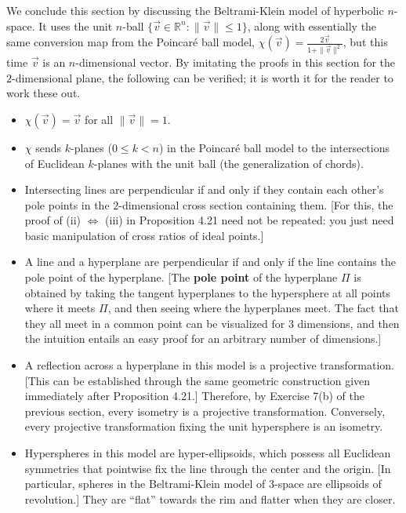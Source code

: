 \documentclass[leqno]{book}
\begin{document}
\noindent We conclude this section by discussing the Beltrami-Klein model of hyperbolic $n$-space.  It uses the unit $n$-ball $\{\vec v\in\mathbb R^n:\|\vec v\|\leqslant 1\}$, along with essentially the same conversion map from the Poincar\'e ball model, $\chi(\vec v)=\frac{2\vec v}{1+\|\vec v\|^2}$, but this time $\vec v$ is an $n$-dimensional vector.  By imitating the proofs in this section for the $2$-dimensional plane, the following can be verified; it is worth it for the reader to work these out.
\begin{itemize}
\item $\chi(\vec v)=\vec v$ for all $\|\vec v\|=1$.

\item $\chi$ sends $k$-planes ($0\leqslant k<n$) in the Poincar\'e ball model to the intersections of Euclidean $k$-planes with the unit ball (the generalization of chords).

\item Intersecting lines are perpendicular if and only if they contain each other's pole points in the $2$-dimensional cross section containing them.  [For this, the proof of (ii) $\iff$ (iii) in Proposition 4.21 need not be repeated: you just need basic manipulation of cross ratios of ideal points.]

\item A line and a hyperplane are perpendicular if and only if the line contains the pole point of the hyperplane.  [The \textbf{pole point} of the hyperplane $\Pi$ is obtained by taking the tangent hyperplanes to the hypersphere at all points where it meets $\Pi$, and then seeing where the hyperplanes meet.  The fact that they all meet in a common point can be visualized for $3$ dimensions, and then the intuition entails an easy proof for an arbitrary number of dimensions.]

\item A reflection across a hyperplane in this model is a projective transformation.  [This can be established through the same geometric construction given immediately after Proposition 4.21.]  Therefore, by Exercise 7(b) of the previous section, every isometry is a projective transformation.  Conversely, every projective transformation fixing the unit hypersphere is an isometry.

\item Hyperspheres in this model are hyper-ellipsoids, which possess all Euclidean symmetries that pointwise fix the line through the center and the origin.  [In particular, spheres in the Beltrami-Klein model of $3$-space are ellipsoids of revolution.]  They are ``flat'' towards the rim and flatter when they are closer.
\end{itemize}
\end{document}
